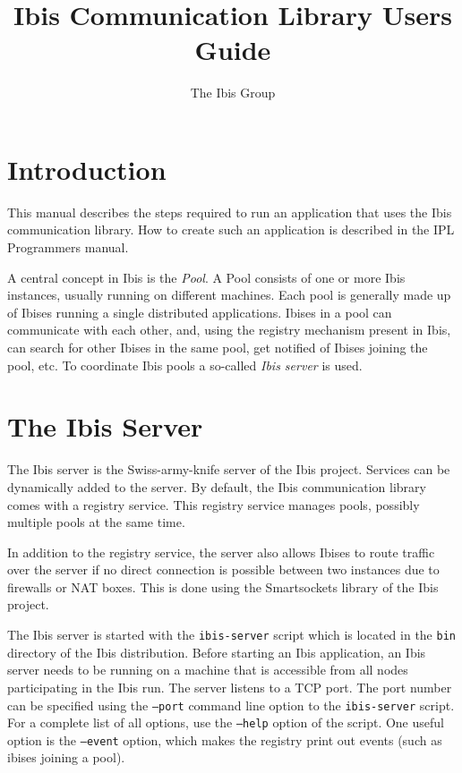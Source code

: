 \documentclass[10pt]{article}
\begin{document}
\title{Ibis Communication Library Users Guide}

\author{The Ibis Group}

\maketitle

\section{Introduction}

This manual describes the steps required to run an application that 
uses the Ibis communication library. How to create such an application
is described in the IPL Programmers manual.

A central concept in Ibis is the \emph{Pool}. A Pool consists of one or
more Ibis instances, usually running on different machines. Each pool is
generally made up of Ibises running a single distributed applications.
Ibises in a pool can communicate with each other, and, using the
registry mechanism present in Ibis, can search for other Ibises in the
same pool, get notified of Ibises joining the pool, etc. To
coordinate Ibis pools a so-called \emph{Ibis server} is used.

\section{The Ibis Server}

The Ibis server is the Swiss-army-knife server of the Ibis project.
Services can be dynamically added to the server. By default, the Ibis
communication library comes with a registry service. This registry
service manages pools, possibly multiple pools at the same time.  

In addition to the registry service, the server also allows
Ibises to route traffic over the server if no direct connection is
possible between two instances due to firewalls or NAT boxes. This is
done using the Smartsockets library of the Ibis project.

The Ibis server is started with the \texttt{ibis-server} script which is
located in the \texttt{bin} directory of the Ibis distribution.  Before
starting an Ibis application, an Ibis server needs to be running on a
machine that is accessible from all nodes participating in the Ibis run.
The server listens to a TCP port. The port number can be specified using
the \texttt{--port} command line option to the \texttt{ibis-server}
script.  For a complete list of all options, use the \texttt{--help}
option of the script. One useful option is the  \texttt{--event}
option, which makes the registry print out events (such as ibises
joining a pool).
\end{document}

